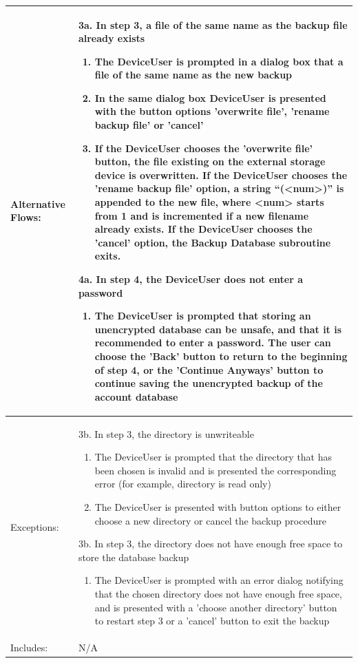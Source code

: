 \documentclass[stu]{apa7}
\newcommand{\nextitemblank}{\par\hspace*{\labelsep}\hspace*{\labelsep}}
\begin{document}
{\begin{xltabular}{\textwidth}{|l|X|}
  Alternative Flows: &
                       \nextitemblank 3a. In step 3, a file of the same name as the backup file already exists
                       \begin{enumerate}
                               \item The DeviceUser is prompted in a dialog box that a file of the same name as the new backup
                               \item In the same dialog box DeviceUser is presented with the button options 'overwrite file', 'rename backup file' or 'cancel'
                               \item If the DeviceUser chooses the 'overwrite file' button, the file existing on the external storage device is overwritten. If the DeviceUser chooses the 'rename backup file' option, a string ``(<num>)'' is appended to the new file, where <num> starts from 1 and is incremented if a new filename already exists. If the DeviceUser chooses the 'cancel' option, the Backup Database subroutine exits.
                       \end{enumerate}
                       \nextitemblank 4a. In step 4, the DeviceUser does not enter a password
                       \begin{enumerate}
                               \item The DeviceUser is prompted that storing an unencrypted database can be unsafe, and that it is recommended to enter a password. The user can choose the 'Back' button to return to the beginning of step 4, or the 'Continue Anyways' button to continue saving the unencrypted backup of the account database
                       \end{enumerate} \\ \hline

  Exceptions: &
                \nextitemblank 3b. In step 3, the directory is unwriteable
                       \begin{enumerate}
                               \item The DeviceUser is prompted that the directory that has been chosen is invalid and is presented the corresponding error (for example, directory is read only)
                               \item The DeviceUser is presented with button options to either choose a new directory or cancel the backup procedure
                       \end{enumerate}
                 \nextitemblank 3b. In step 3, the directory does not have enough free space to store the database backup
                       \begin{enumerate}
                               \item The DeviceUser is prompted with an error dialog notifying that the chosen directory does not have enough free space, and is presented with a 'choose another directory' button to restart step 3 or a 'cancel' button to exit the backup
                       \end{enumerate}
              \\ \hline
  Includes: & N/A \\ \hline


\end{xltabular}}
\end{document}

